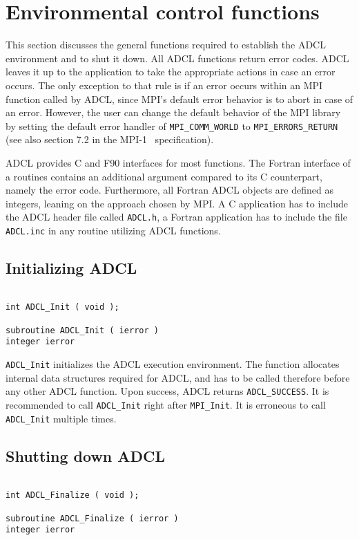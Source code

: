 \section{Environmental control functions}

This section discusses the general functions required to establish the ADCL environment and to shut it down.
All ADCL functions return error codes. ADCL leaves it up to the application to take the appropriate actions  in case an error occurs. The only exception to that rule is if an error occurs within an MPI function called by ADCL, since MPI's default error behavior is to abort in case of an error. However, the user can change the default behavior of the MPI library by setting the default error handler of {\tt MPI\_COMM\_WORLD} to {\tt MPI\_ERRORS\_RETURN} (see also section 7.2 in the MPI-1~\cite{mpi1} specification).

ADCL provides C and F90 interfaces for most functions. The Fortran interface of a routines contains an additional argument compared to its C counterpart, namely the error code. Furthermore, all Fortran ADCL objects are defined as integers, leaning on the approach chosen by MPI. A C application has to include the ADCL header file called {\tt ADCL.h}, a Fortran application has to include the file {\tt ADCL.inc} in any routine utilizing ADCL functions.

\subsection{Initializing ADCL}
\begin{verbatim}

int ADCL_Init ( void );

subroutine ADCL_Init ( ierror )
integer ierror

\end{verbatim}

{\tt ADCL\_Init} initializes the ADCL execution environment. The function allocates internal data structures required for ADCL, and has to be called therefore before any other ADCL function. Upon success, ADCL returns {\tt ADCL\_SUCCESS}. It is recommended to call {\tt ADCL\_Init} right after {\tt MPI\_Init}. It is erroneous to call {\tt ADCL\_Init} multiple times.

\subsection{Shutting down ADCL}

\begin{verbatim}

int ADCL_Finalize ( void );

subroutine ADCL_Finalize ( ierror )
integer ierror
\end{verbatim}

